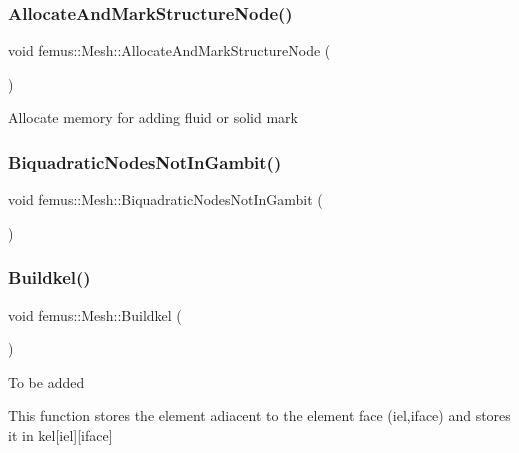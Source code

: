 \subsubsection{\texorpdfstring{Allocate\+And\+Mark\+Structure\+Node()}{AllocateAndMarkStructureNode()}}
{\footnotesize\ttfamily void femus\+::\+Mesh\+::\+Allocate\+And\+Mark\+Structure\+Node (\begin{DoxyParamCaption}{ }\end{DoxyParamCaption})}

Allocate memory for adding fluid or solid mark \mbox{\label{classfemus_1_1_mesh_a3445a0286d1d6d752ac8651df9cc147a}} 
\subsubsection{\texorpdfstring{Biquadratic\+Nodes\+Not\+In\+Gambit()}{BiquadraticNodesNotInGambit()}}
{\footnotesize\ttfamily void femus\+::\+Mesh\+::\+Biquadratic\+Nodes\+Not\+In\+Gambit (\begin{DoxyParamCaption}{ }\end{DoxyParamCaption})}

\mbox{\label{classfemus_1_1_mesh_a3ee594bef27d2d809211d3eb7d26e773}} 
\subsubsection{\texorpdfstring{Buildkel()}{Buildkel()}}
{\footnotesize\ttfamily void femus\+::\+Mesh\+::\+Buildkel (\begin{DoxyParamCaption}{ }\end{DoxyParamCaption})}

To be added

This function stores the element adiacent to the element face (iel,iface) and stores it in kel\mbox{[}iel\mbox{]}\mbox{[}iface\mbox{]} \mbox{\label{classfemus_1_1_mesh_ae9899737d77417df9527e6a9a59d02e5}} 
